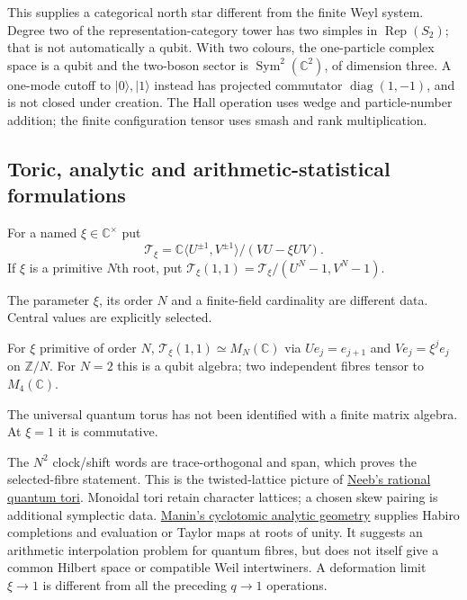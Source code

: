 This supplies a categorical north star different from the finite Weyl
system. Degree two of the representation-category tower has two simples
in $\operatorname{Rep}(S_2)$; that is not automatically a qubit. With
two colours, the one-particle complex space is a qubit and the two-boson
sector is $\operatorname{Sym}^2(\mathbb C^2)$, of dimension three.
A one-mode cutoff to $|0\rangle,|1\rangle$ instead has projected
commutator $\operatorname{diag}(1,-1)$, and is not closed under creation.
The Hall operation uses wedge and particle-number addition; the finite
configuration tensor uses smash and rank multiplication.

\subsection{Toric, analytic and arithmetic-statistical formulations}

\begin{definition}
For a named $\xi\in\mathbb C^\times$ put
\[
\mathcal T_\xi=\mathbb C\langle U^{\pm1},V^{\pm1}\rangle/(VU-\xi UV).
\]
If $\xi$ is a primitive $N$th root, put
$\mathcal T_\xi(1,1)=\mathcal T_\xi/(U^N-1,V^N-1)$.
\end{definition}
\begin{scope}The parameter $\xi$, its order $N$ and a finite-field
cardinality are different data. Central values are explicitly selected.\end{scope}

\begin{proposition}
{\normalfont\statusSketch}\quad For $\xi$ primitive of order $N$,
$\mathcal T_\xi(1,1)\simeq M_N(\mathbb C)$ via
$Ue_j=e_{j+1}$ and $Ve_j=\xi^je_j$ on $\mathbb Z/N$.
For $N=2$ this is a qubit algebra; two independent fibres tensor to
$M_4(\mathbb C)$.
\end{proposition}
\begin{scope}The universal quantum torus has not been identified with
a finite matrix algebra. At $\xi=1$ it is commutative.\end{scope}

The $N^2$ clock/shift words are trace-orthogonal and span, which proves
the selected-fibre statement. This is the twisted-lattice picture of
\href{https://arxiv.org/abs/math/0511263}{Neeb's rational quantum tori}.
Monoidal tori retain character lattices; a chosen skew pairing is
additional symplectic data. \href{https://arxiv.org/abs/0809.1564}{Manin's
cyclotomic analytic geometry} supplies Habiro completions and evaluation
or Taylor maps at roots of unity. It suggests an arithmetic interpolation
problem for quantum fibres, but does not itself give a common Hilbert
space or compatible Weil intertwiners. A deformation limit $\xi\to1$
is different from all the preceding $q\to1$ operations.

